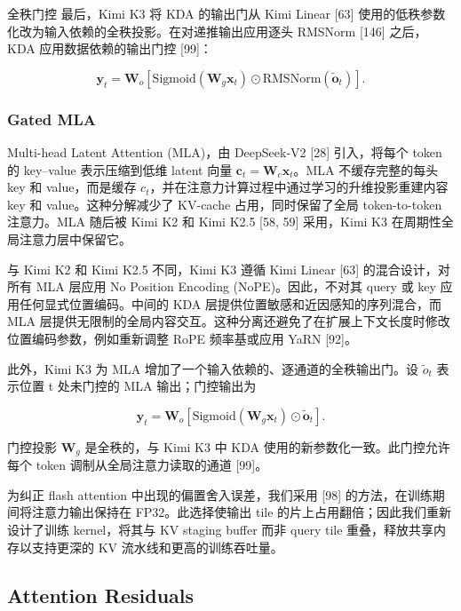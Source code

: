 \documentclass[
  10
]{article}
\begin{document}
全秩门控 最后，Kimi K3 将 KDA 的输出门从 Kimi Linear {[}63{]} 使用的低秩参数化改为输入依赖的全秩投影。在对递推输出应用逐头 RMSNorm {[}146{]} 之后，KDA 应用数据依赖的输出门控 {[}99{]}：

\[
\boldsymbol {y} _ {t} = \mathbf {W} _ {o} [ \mathrm{Sigmoid} (\mathbf {W} _ {g} \boldsymbol {x} _ {t}) \odot \mathrm{RMSNorm} (\tilde {\boldsymbol {o}} _ {t}) ].\tag{6}
\]

\subsubsection{Gated MLA}\label{gated-mla}

Multi-head Latent Attention (MLA)，由 DeepSeek-V2 {[}28{]} 引入，将每个 token 的 key--value 表示压缩到低维 latent 向量 \(\pmb { c } _ { t } = \mathbf { W } _ { c } \pmb { x } _ { t }\)。MLA 不缓存完整的每头 key 和 value，而是缓存 \(c _ { t }\)，并在注意力计算过程中通过学习的升维投影重建内容 key 和 value。这种分解减少了 KV-cache 占用，同时保留了全局 token-to-token 注意力。MLA 随后被 Kimi K2 和 Kimi K2.5 {[}58, 59{]} 采用，Kimi K3 在周期性全局注意力层中保留它。

与 Kimi K2 和 Kimi K2.5 不同，Kimi K3 遵循 Kimi Linear {[}63{]} 的混合设计，对所有 MLA 层应用 No Position Encoding (NoPE)。因此，不对其 query 或 key 应用任何显式位置编码。中间的 KDA 层提供位置敏感和近因感知的序列混合，而 MLA 层提供无限制的全局内容交互。这种分离还避免了在扩展上下文长度时修改位置编码参数，例如重新调整 RoPE 频率基或应用 YaRN {[}92{]}。

此外，Kimi K3 为 MLA 增加了一个输入依赖的、逐通道的全秩输出门。设 \({ \tilde { o } } _ { t }\) 表示位置 t 处未门控的 MLA 输出；门控输出为

\[
\boldsymbol {y} _ {t} = \mathbf {W} _ {o} [ \text {Sigmoid} (\mathbf {W} _ {g} \boldsymbol {x} _ {t}) \odot \tilde {\boldsymbol {o}} _ {t} ]  .\tag{7}
\]

门控投影 \(\mathbf { W } _ { g }\) 是全秩的，与 Kimi K3 中 KDA 使用的新参数化一致。此门控允许每个 token 调制从全局注意力读取的通道 {[}99{]}。

为纠正 flash attention 中出现的偏置舍入误差，我们采用 {[}98{]} 的方法，在训练期间将注意力输出保持在 FP32。此选择使输出 tile 的片上占用翻倍；因此我们重新设计了训练 kernel，将其与 KV staging buffer 而非 query tile 重叠，释放共享内存以支持更深的 KV 流水线和更高的训练吞吐量。

\subsection{Attention Residuals}\label{attention-residuals}
\end{document}

